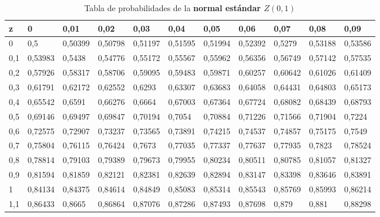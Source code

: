 \documentclass[addpoints,spanish, 12pt,a4paper]{exam}
\begin{document}
\begin{questions}
        
        





        
    \end{questions}
    
    
\begin{table}
\centering

\caption{Tabla de probabilidades de la \textbf{normal estándar $Z(0,1)$}}
\label{my-label}

\begin{tabular}{l|llllllllll}
z   & 0       & 0,01    & 0,02    & 0,03    & 0,04    & 0,05    & 0,06    & 0,07    & 0,08    & 0,09    \\
\hline
0   & 0,5     & 0,50399 & 0,50798 & 0,51197 & 0,51595 & 0,51994 & 0,52392 & 0,5279  & 0,53188 & 0,53586 \\
0,1 & 0,53983 & 0,5438  & 0,54776 & 0,55172 & 0,55567 & 0,55962 & 0,56356 & 0,56749 & 0,57142 & 0,57535 \\
0,2 & 0,57926 & 0,58317 & 0,58706 & 0,59095 & 0,59483 & 0,59871 & 0,60257 & 0,60642 & 0,61026 & 0,61409 \\
0,3 & 0,61791 & 0,62172 & 0,62552 & 0,6293  & 0,63307 & 0,63683 & 0,64058 & 0,64431 & 0,64803 & 0,65173 \\
0,4 & 0,65542 & 0,6591  & 0,66276 & 0,6664  & 0,67003 & 0,67364 & 0,67724 & 0,68082 & 0,68439 & 0,68793 \\
0,5 & 0,69146 & 0,69497 & 0,69847 & 0,70194 & 0,7054  & 0,70884 & 0,71226 & 0,71566 & 0,71904 & 0,7224  \\
0,6 & 0,72575 & 0,72907 & 0,73237 & 0,73565 & 0,73891 & 0,74215 & 0,74537 & 0,74857 & 0,75175 & 0,7549  \\
0,7 & 0,75804 & 0,76115 & 0,76424 & 0,7673  & 0,77035 & 0,77337 & 0,77637 & 0,77935 & 0,7823  & 0,78524 \\
0,8 & 0,78814 & 0,79103 & 0,79389 & 0,79673 & 0,79955 & 0,80234 & 0,80511 & 0,80785 & 0,81057 & 0,81327 \\
0,9 & 0,81594 & 0,81859 & 0,82121 & 0,82381 & 0,82639 & 0,82894 & 0,83147 & 0,83398 & 0,83646 & 0,83891 \\
1   & 0,84134 & 0,84375 & 0,84614 & 0,84849 & 0,85083 & 0,85314 & 0,85543 & 0,85769 & 0,85993 & 0,86214 \\
1,1 & 0,86433 & 0,8665  & 0,86864 & 0,87076 & 0,87286 & 0,87493 & 0,87698 & 0,879   & 0,881   & 0,88298 \\

\end{tabular}
\end{table}
\end{document}
